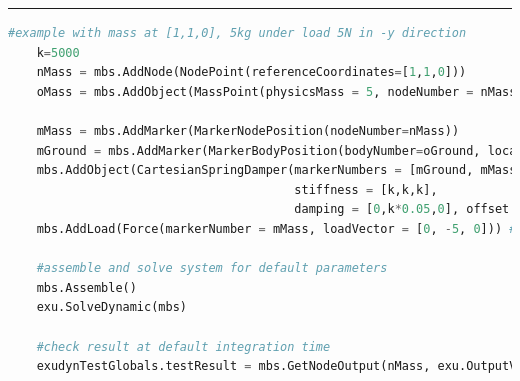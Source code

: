 \vspace{6pt}\par\noindent\rule{\textwidth}{0.4pt}
\label{miniExample_ObjectConnectorCartesianSpringDamper}
\pythonstyle
\begin{lstlisting}[language=Python, firstnumber=1]
    #example with mass at [1,1,0], 5kg under load 5N in -y direction
    k=5000
    nMass = mbs.AddNode(NodePoint(referenceCoordinates=[1,1,0]))
    oMass = mbs.AddObject(MassPoint(physicsMass = 5, nodeNumber = nMass))
    
    mMass = mbs.AddMarker(MarkerNodePosition(nodeNumber=nMass))
    mGround = mbs.AddMarker(MarkerBodyPosition(bodyNumber=oGround, localPosition = [1,1,0]))
    mbs.AddObject(CartesianSpringDamper(markerNumbers = [mGround, mMass], 
                                        stiffness = [k,k,k], 
                                        damping = [0,k*0.05,0], offset = [0,0,0]))
    mbs.AddLoad(Force(markerNumber = mMass, loadVector = [0, -5, 0])) #static solution=-5/5000=-0.001m

    #assemble and solve system for default parameters
    mbs.Assemble()
    exu.SolveDynamic(mbs)

    #check result at default integration time
    exudynTestGlobals.testResult = mbs.GetNodeOutput(nMass, exu.OutputVariableType.Displacement)[1]

\end{lstlisting}

